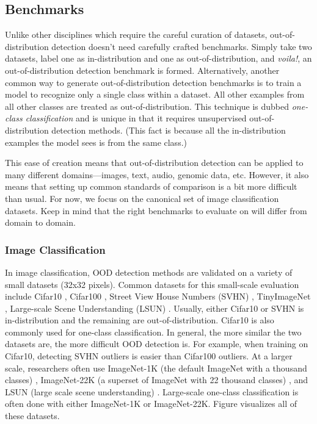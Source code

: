 \documentclass{article}
\begin{document}
\subsection{Benchmarks}

Unlike other disciplines which require the careful curation of datasets, out-of-distribution detection doesn’t need carefully crafted benchmarks. Simply take two datasets, label one as in-distribution and one as out-of-distribution, and \textit{voila!}, an out-of-distribution detection benchmark is formed. Alternatively, another common way to generate out-of-distribution detection benchmarks is to train a model to recognize only a single class within a dataset. All other examples from all other classes are treated as out-of-distribution. This technique is dubbed \textit{one-class classification} and is unique in that it requires unsupervised out-of-distribution detection methods. (This fact is because all the in-distribution examples the model sees is from the same class.)

This ease of creation means that out-of-distribution detection can be applied to many different domains—images, text, audio, genomic data, etc. However, it also means that setting up common standards of comparison is a bit more difficult than usual. For now, we focus on the canonical set of image classification datasets. Keep in mind that the right benchmarks to evaluate on will differ from domain to domain.

\subsubsection{Image Classification}
In image classification, OOD detection methods are validated on a variety of small datasets (32x32 pixels). Common datasets for this small-scale evaluation include Cifar10 \cite{krizhevsky09learning}, Cifar100 \cite{krizhevsky09learning}, Street View House Numbers (SVHN) \cite{netzer2011reading}, TinyImageNet \cite{le2015tiny}, Large-scale Scene Understanding (LSUN) \cite{yu2016lsun}. Usually, either Cifar10 or SVHN is in-distribution and the remaining are out-of-distribution. Cifar10 is also commonly used for one-class classification. In general, the more similar the two datasets are, the more difficult OOD detection is. For example, when training on Cifar10, detecting SVHN outliers is easier than Cifar100 outliers. At a larger scale, researchers often use ImageNet-1K (the default ImageNet with a thousand classes) \cite{deng2009imagenet}, ImageNet-22K (a superset of ImageNet with 22 thousand classes) \cite{deng2009imagenet}, and LSUN (large scale scene understanding) \cite{yu2016lsun}. Large-scale one-class classification is often done with either ImageNet-1K or ImageNet-22K. Figure  visualizes all of these datasets.
\end{document}
